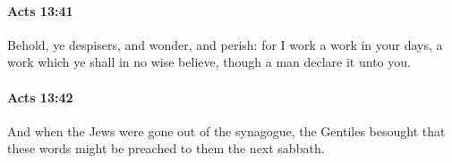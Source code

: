 		\paragraph{Acts 13:41} %
			\label{ACTS-13-41}

			Behold, ye despisers, and wonder, and perish: for I work a work in your days, a work which ye shall in no wise believe, though a man declare it unto you.

			\begin{framed}
			\scriptsize
				\begin{compactdesc}
					\item[SBLG] 
				\end{compactdesc}
			\end{framed}

		\paragraph{Acts 13:42} %
			\label{ACTS-13-42}

			And when the Jews were gone out of the synagogue, the Gentiles besought that these words might be preached to them the next sabbath.

